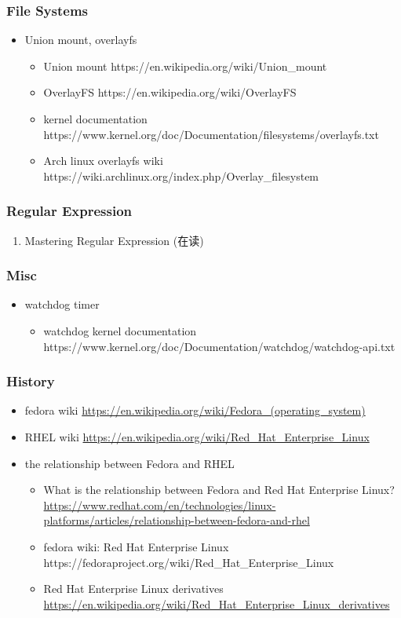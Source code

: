 \documentclass{article}
\begin{document}
\subsubsection{File Systems}
%
\begin{itemize}
    \item Union mount, overlayfs
        \begin{itemize}
            \item Union mount https://en.wikipedia.org/wiki/Union_mount
            \item OverlayFS https://en.wikipedia.org/wiki/OverlayFS
            \item kernel documentation https://www.kernel.org/doc/Documentation/filesystems/overlayfs.txt
            \item Arch linux overlayfs wiki https://wiki.archlinux.org/index.php/Overlay_filesystem
        \end{itemize}
\end{itemize}
\subsubsection{Regular Expression}
\begin{enumerate}
    \item Mastering Regular Expression (在读)
\end{enumerate}
%
\subsubsection{Misc}
%
\begin{itemize}
    \item watchdog timer
        \begin{itemize}
            \item watchdog kernel documentation https://www.kernel.org/doc/Documentation/watchdog/watchdog-api.txt
        \end{itemize}
\end{itemize}
%
\subsubsection{History}
%
\begin{itemize}
    \item fedora wiki \url{https://en.wikipedia.org/wiki/Fedora_(operating_system)}
    \item RHEL wiki \url{https://en.wikipedia.org/wiki/Red_Hat_Enterprise_Linux}
    \item the relationship between Fedora and RHEL
        \begin{itemize}
            \item What is the relationship between Fedora and Red Hat Enterprise Linux? \url{https://www.redhat.com/en/technologies/linux-platforms/articles/relationship-between-fedora-and-rhel}
            \item fedora wiki: Red Hat Enterprise Linux {https://fedoraproject.org/wiki/Red_Hat_Enterprise_Linux}
            \item Red Hat Enterprise Linux derivatives \url{https://en.wikipedia.org/wiki/Red_Hat_Enterprise_Linux_derivatives}
        \end{itemize}
\end{itemize}
\end{document}

